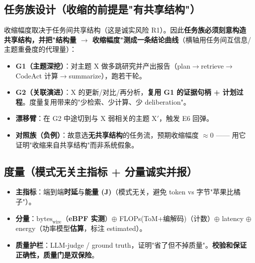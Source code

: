 \documentclass[UTF8,fontset=windows,11pt]{ctexart}
\newcommand{\key}[1]{\textbf{\textcolor{NavyBlue}{#1}}}
\begin{document}
\subsection{任务族设计（收缩的前提是"有共享结构"）}
收缩幅度取决于任务间共享结构（这是诚实风险 R1）。因此\textbf{任务族必须刻意构造共享结构，并把"结构量 $\to$ 收缩幅度"测成一条结论曲线}（横轴用任务间互信息/主题重叠度的代理量）：
\begin{itemize}
\item \key{G1（主题深挖）}：对主题 X 做多跳研究并产出报告（plan$\to$retrieve$\to$CodeAct 计算$\to$summarize），跑若干轮。
\item \key{G2（关联演进）}：X 的更新/对比/再分析，\textbf{复用 G1 的证据句柄 + 计划过程}。度量复用带来的"少检索、少计算、少 deliberation"。
\item \key{漂移臂}：在 G2 中途切到与 X 弱相关的主题 X$'$，触发 E6 回弹。
\item \key{对照族（负例）}：故意选\textbf{无共享结构}的任务流，预期收缩幅度 $\approx 0$ —— 用它证明"收缩来自共享结构"而非系统假象。
\end{itemize}

\subsection{度量（模式无关主指标 + 分量诚实并报）}
\begin{itemize}
\item \key{主指标}：端到端\textbf{时延}与\textbf{能量 (J)}（模式无关，避免 token vs 字节"苹果比橘子"）。
\item \key{分量}：$\mathrm{bytes}_{\text{wire}}$（\textbf{eBPF 实测}）$\oplus$ FLOPs(ToM+编解码)（计数）$\oplus$ latency $\oplus$ energy（功率模型\textbf{估算}，标注 estimated）。
\item \key{质量护栏}：LLM-judge / ground truth，证明"省了但不掉质量"。\textbf{校验和保证正确性，质量门是双保险}。
\end{itemize}
\end{document}

